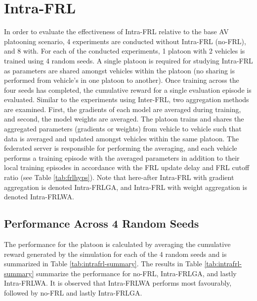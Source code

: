 \section{Intra-FRL}
In order to evaluate the effectiveness of Intra-FRL relative to the base AV platooning scenario, 4 experiments are conducted without Intra-FRL (no-FRL), and 8 with.  For each of the conducted experiments, 1 platoon with 2 vehicles is trained using 4 random seeds.  A single platoon is required for studying Intra-FRL as parameters are shared amongst vehicles within the platoon (no sharing is performed from vehicle's in one platoon to another).  Once training across the four seeds has completed, the cumulative reward for a single evaluation episode is evaluated.  Similar to the experiments using Inter-FRL, two aggregation methods are examined.  First, the gradients of each model are averaged during training, and second, the model weights are averaged.  The platoon trains and shares the aggregated parameters (gradients or weights) from vehicle to vehicle such that data is averaged and updated amongst vehicles within the same platoon. The federated server is responsible for performing the averaging, and each vehicle performs a training episode with the averaged parameters in addition to their local training episodes in accordance with the FRL update delay and FRL cutoff ratio (see Table \ref{tab:frlhyps}).  Note that here-after Intra-FRL with gradient aggregation is denoted Intra-FRLGA, and Intra-FRL with weight aggregation is denoted Intra-FRLWA.


\subsection{Performance Across 4 Random Seeds}
The performance for the platoon is calculated by averaging the cumulative reward generated by the simulation for each of the 4 random seeds and is summarized in Table \ref{tab:intrafrl-summary}. The results in Table \ref{tab:intrafrl-summary} summarize the performance for no-FRL, Intra-FRLGA, and lastly Intra-FRLWA.  It is observed that Intra-FRLWA performs most favourably, followed by no-FRL and lastly Intra-FRLGA.  


